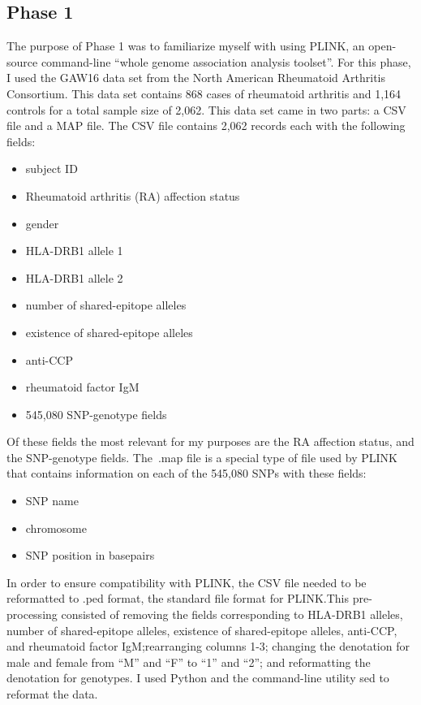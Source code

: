 \documentclass{article}
\begin{document}
\subsection*{Phase 1}
The purpose of Phase 1 was to familiarize myself with using PLINK, an open-source 
command-line ``whole genome association analysis toolset''\cite{Chang}. For this 
phase, I used the GAW16 data set from the North American Rheumatoid Arthritis 
Consortium. This data set contains 868 cases of rheumatoid arthritis and 1,164 controls for a total sample size of 2,062. 
This data set came in two parts: a CSV file and a MAP file. The 
CSV file contains 2,062 records each with the following fields:
\begin{itemize}
    \item{subject ID}
    \item{Rheumatoid arthritis (RA) affection status}
    \item{gender}
    \item{HLA-DRB1 allele 1}
    \item{HLA-DRB1 allele 2}
    \item{number of shared-epitope alleles}
    \item{existence of shared-epitope alleles}
    \item{anti-CCP}
    \item{rheumatoid factor IgM}
    \item{545,080 SNP-genotype fields}
\end{itemize}
Of these fields the most relevant for my purposes are the RA affection status, 
and the SNP-genotype fields. The\ .map file is a special type of file used by 
PLINK that contains information on each of the 545,080 SNPs with these fields:
\begin{itemize}
    \item{SNP name}
    \item{chromosome}
    \item{SNP position in basepairs}
\end{itemize}

In order to ensure compatibility with PLINK, the CSV file needed to be 
reformatted to .ped format, the standard file format for PLINK.\@ This 
pre-processing consisted of removing the fields corresponding to HLA-DRB1 
alleles, number of shared-epitope alleles, existence of shared-epitope alleles, 
anti-CCP, and rheumatoid factor IgM;\@ rearranging columns 1-3; changing the 
denotation for male and female from ``M'' and ``F'' to ``1'' and ``2''; and
reformatting the denotation for genotypes. I used Python and the command-line 
utility sed to reformat the data.
\end{document}
